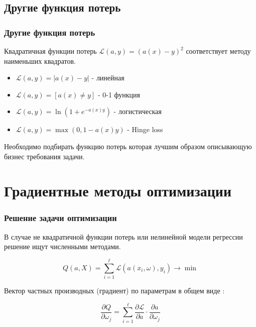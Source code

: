 \documentclass{beamer}
\begin{document}
	\subsection{Другие функция потерь}
	
	\begin{frame}
		\frametitle{Другие функция потерь}
		Квадратичная функции потерь $\mathcal{L}(a, y) = (a(x) - y)^2$ соответствует методу наименьших квадратов. 
		
		\vspace{5pt}
		
		\begin{itemize}
			\item $\mathcal{L}(a, y) = |a(x) - y|$ - линейная
			\item $\mathcal{L}(a, y) = [a(x) \ne y]$ - 0-1 функция
			\item $\mathcal{L}(a, y) = \ln(1 + e^{- a(x) y})$ - логистическая
			\item $\mathcal{L}(a, y) = \max(0, 1 - a(x) y)$ - Hinge loss
		\end{itemize}
		
		\vspace{5pt}
		
		Необходимо подбирать функцию потерь которая лучшим образом описывающую бизнес требования задачи.
	\end{frame}
	
	
	\section{Градиентные методы оптимизации}
	
	
	\begin{frame}
		\frametitle{Решение задачи оптимизации}
		В случае не квадратичной функции потерь или нелинейной модели регрессии решение ищут численными методами.
		
		\[
		Q(a, X) = \sum_{i=1}^{\ell} \mathcal{L}(a(x_i, \omega), y_i) \rightarrow \min
		\]
		
		
		Вектор частных производных (градиент) по параметрам в общем виде :
	
		\[
		\frac{\partial Q}{\partial \omega_j} = \sum_{i=1}^{\ell} \frac{\partial \mathcal{L}}{\partial a} \cdot \frac{\partial a}{\partial \omega_j}
		\]
	\end{frame}
	
\end{document}
